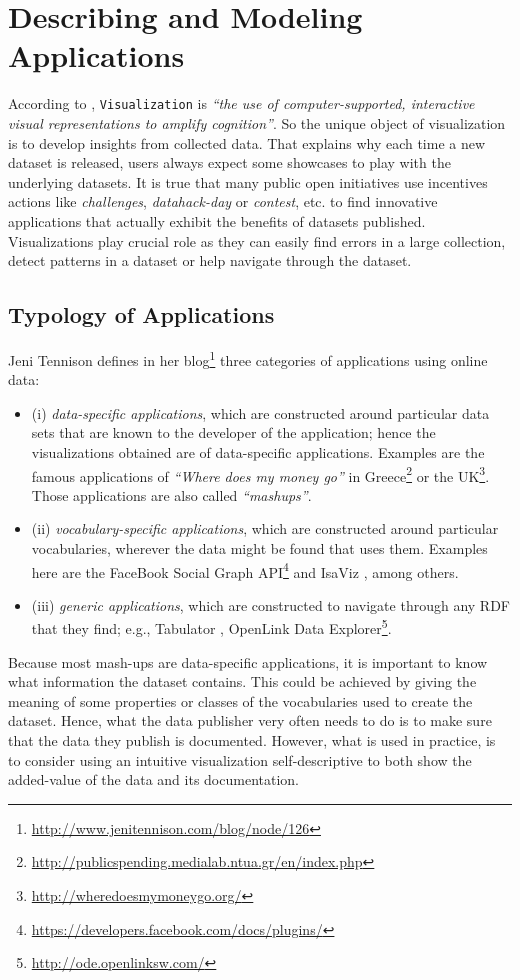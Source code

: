 \section{Describing and Modeling Applications}
\label{sec:apps}
According to \cite{card99}, \texttt{Visualization} is \textit{ ``the use of computer-supported, interactive visual representations to amplify cognition''}. So the unique object of visualization is to develop insights from collected data. That explains why each time a new dataset is released, users always expect some showcases to play with the underlying datasets. It is true that many public open initiatives use incentives actions like \textit{challenges}, \textit{datahack-day} or \textit{contest}, etc. to find innovative applications that actually exhibit the benefits of datasets published. Visualizations play crucial role as they can easily find errors in a large collection, detect patterns in a dataset or help navigate through the dataset.

\subsection{Typology of Applications}
Jeni Tennison defines  in her blog\footnote{\url{http://www.jenitennison.com/blog/node/126}} three categories of applications using online data:
\begin{itemize}
\item (i) \textit{data-specific applications}, which are constructed around particular data sets that are known to the developer of the application; hence the visualizations obtained are of data-specific applications. Examples are the famous applications of \textit{``Where does my money go''}  in Greece\footnote{\url{http://publicspending.medialab.ntua.gr/en/index.php}} or the UK\footnote{\url{http://wheredoesmymoneygo.org/}}. Those applications are also called \textit{``mashups''}.
\item (ii) \textit{vocabulary-specific applications}, which are constructed around particular vocabularies, wherever the data might be found that uses them. Examples here are the FaceBook Social Graph API\footnote{\url{https://developers.facebook.com/docs/plugins/}} and IsaViz  \cite{isaviz}, among others.
\item (iii) \textit{generic applications}, which are constructed to navigate through any RDF that they find; e.g., Tabulator \cite{tabulator06}, OpenLink Data Explorer\footnote{\url{http://ode.openlinksw.com/}}.

\end{itemize}
Because most mash-ups are data-specific applications, it is important to  know what information the dataset contains. This could be achieved by giving the meaning of some properties or classes of the vocabularies used to create the dataset. Hence, what the data publisher very often needs to do is to make sure that the data they publish is documented. However, what is used in practice, is to consider using an intuitive visualization self-descriptive to both show the added-value of the data and its documentation.


